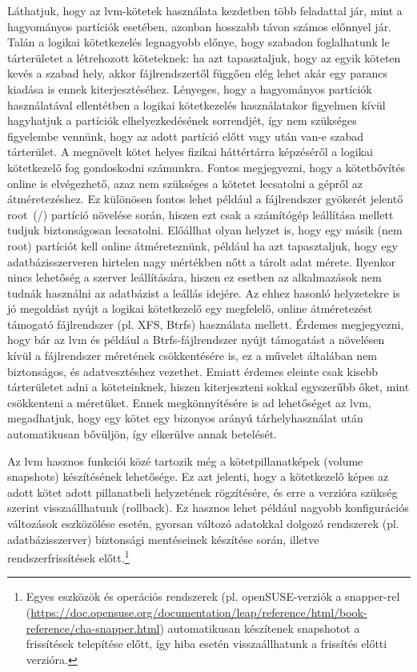 Láthatjuk, hogy az \acrshort{lvm}-kötetek használata kezdetben több feladattal jár, mint a hagyományos partíciók esetében, azonban hosszabb távon számos előnnyel jár. Talán a logikai kötetkezelés legnagyobb előnye, hogy szabadon foglalhatunk le tárterületet a létrehozott köteteknek: ha azt tapasztaljuk, hogy az egyik köteten kevés a szabad hely, akkor fájlrendszertől függően elég lehet akár egy parancs kiadása is ennek kiterjesztéséhez. Lényeges, hogy a hagyományos partíciók használatával ellentétben a logikai kötetkezelés használatakor figyelmen kívül hagyhatjuk a partíciók elhelyezkedésének sorrendjét, így nem szükséges figyelembe vennünk, hogy az adott partíció előtt vagy után van-e szabad tárterület. A megnövelt kötet helyes fizikai háttértárra képzéséről a logikai kötetkezelő fog gondoskodni számunkra. Fontos megjegyezni, hogy a kötetbővítés online is elvégezhető, azaz nem szükséges a kötetet lecsatolni a gépről az átméretezéshez. Ez különösen fontos lehet például a fájlrendszer gyökerét jelentő root~(/) partíció növelése során, hiszen ezt csak a számítógép leállítása mellett tudjuk biztonságosan lecsatolni. Előállhat olyan helyzet is, hogy egy másik (nem root) partíciót kell online átméreteznünk, például ha azt tapasztaljuk, hogy egy adatbázisszerveren hirtelen nagy mértékben nőtt a tárolt adat mérete. Ilyenkor nincs lehetőség a szerver leállítására, hiszen ez esetben az alkalmazások nem tudnák használni az adatbázist a leállás idejére. Az ehhez hasonló helyzetekre is jó megoldást nyújt a logikai kötetkezelő egy megfelelő, online átméretezést támogató fájlrendszer (pl. XFS, Btrfs) használata mellett. Érdemes megjegyezni, hogy bár az \acrshort{lvm} és például a Btrfs-fájlrendszer nyújt támogatást a növelésen kívül a fájlrendszer méretének csökkentésére is, ez a művelet általában nem biztonságos, és adatvesztéshez vezethet. Emiatt érdemes eleinte csak kisebb tárterületet adni a köteteinknek, hiszen kiterjeszteni sokkal egyszerűbb őket, mint csökkenteni a méretüket. Ennek megkönnyítésére is ad lehetőséget az \acrshort{lvm}, megadhatjuk, hogy egy kötet egy bizonyos arányú tárhelyhasználat után automatikusan bővüljön, így elkerülve annak betelését.

Az \acrshort{lvm} hasznos funkciói közé tartozik még a kötetpillanatképek (volume snapshots) készítésének lehetősége. Ez azt jelenti, hogy a kötetkezelő képes az adott kötet adott pillanatbeli helyzetének rögzítésére, és erre a verzióra szükség szerint visszaállhatunk (rollback). Ez hasznos lehet például nagyobb konfigurációs változások eszközölése esetén, gyorsan változó adatokkal dolgozó rendszerek (pl. adatbázisszerver) biztonsági mentéseinek készítése során, illetve rendszerfrissítések előtt.\footnote{Egyes eszközök és operációs rendszerek (pl. openSUSE-verziók a snapper-rel (\url{https://doc.opensuse.org/documentation/leap/reference/html/book-reference/cha-snapper.html}) automatikusan készítenek snapshotot a frissítések telepítése előtt, így hiba esetén visszaállhatunk a frissítés előtti verzióra.}

